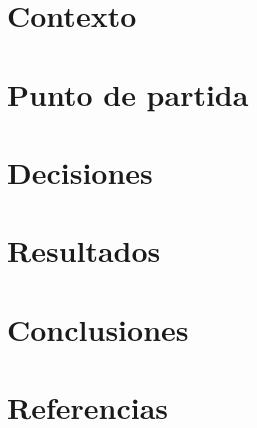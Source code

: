 \documentclass[10pt,aspectratio=169]{beamer}
\title[\DeliveryShortTitle]{\DeliveryTitle}
\subtitle{\DeliverySubtitle}
\author[\AuthorShort]{\AuthorName}
\institute[\InstituteShort]{\InstituteBlock}
\date{\DeliveryDate}
\begin{document}
\begin{frame}
  \titlepage
\end{frame}

\section{Contexto}


\section{Punto de partida}


\section{Decisiones}


\section{Resultados}



\section{Conclusiones}


\section*{Referencias}


\begin{frame}
  \titlepage
\end{frame}
\end{document}
